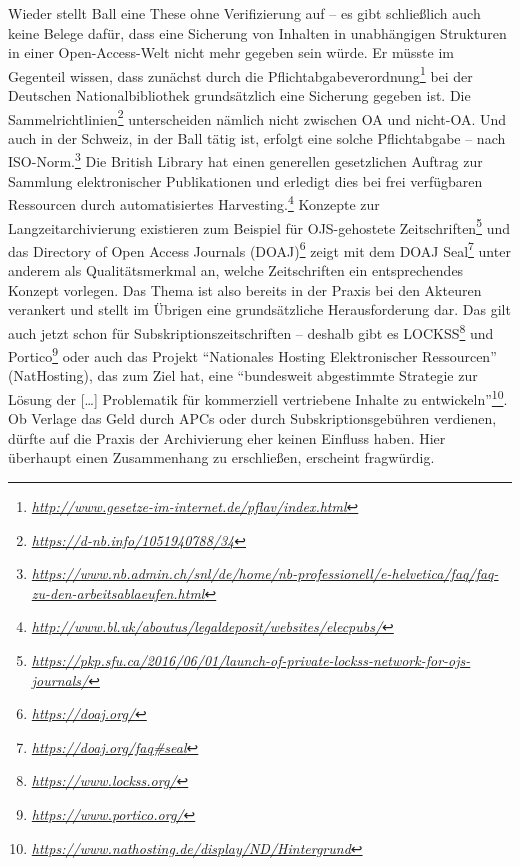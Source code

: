 \documentclass[a4paper,
fontsize=11pt,
oneside,
numbers=noperiodatend,
parskip=half-,
bibliography=totoc,
final
]{scrartcl}
\begin{document}
Wieder stellt Ball eine These ohne Verifizierung auf -- es gibt
schließlich auch keine Belege dafür, dass eine Sicherung von Inhalten in
unabhängigen Strukturen in einer Open-Access-Welt nicht mehr gegeben
sein würde. Er müsste im Gegenteil wissen, dass zunächst durch die
Pflichtabgabeverordnung\footnote{\href{http://www.gesetze-im-internet.de/pflav/index.html}{\emph{http://www.gesetze-im-internet.de/pflav/index.html}}}
bei der Deutschen Nationalbibliothek grundsätzlich eine Sicherung
gegeben ist. Die Sammelrichtlinien\footnote{\href{https://d-nb.info/1051940788/34}{\emph{https://d-nb.info/1051940788/34}}}
unterscheiden nämlich nicht zwischen OA und nicht-OA. Und auch in der
Schweiz, in der Ball tätig ist, erfolgt eine solche Pflichtabgabe --
nach ISO-Norm.\footnote{\href{https://www.nb.admin.ch/snl/de/home/nb-professionell/e-helvetica/faq/faq-zu-den-arbeitsablaeufen.html}{\emph{https://www.nb.admin.ch/snl/de/home/nb-professionell/e-helvetica/faq/faq-zu-den-arbeitsablaeufen.html}}}
Die British Library hat einen generellen gesetzlichen Auftrag zur
Sammlung elektronischer Publikationen und erledigt dies bei frei
verfügbaren Ressourcen durch automatisiertes Harvesting.\footnote{\href{http://www.bl.uk/aboutus/legaldeposit/websites/elecpubs/}{\emph{http://www.bl.uk/aboutus/legaldeposit/websites/elecpubs/}}}
Konzepte zur Langzeitarchivierung existieren zum Beispiel für
OJS-gehostete Zeitschriften\footnote{\href{https://pkp.sfu.ca/2016/06/01/launch-of-private-lockss-network-for-ojs-journals/}{\emph{https://pkp.sfu.ca/2016/06/01/launch-of-private-lockss-network-for-ojs-journals/}}}
und das Directory of Open Access Journals (DOAJ)\footnote{\href{https://doaj.org/}{\emph{https://doaj.org/}}}
zeigt mit dem DOAJ Seal\footnote{\href{https://doaj.org/faq\#seal}{\emph{https://doaj.org/faq\#seal}}}
unter anderem als Qualitätsmerkmal an, welche Zeitschriften ein
entsprechendes Konzept vorlegen. Das Thema ist also bereits in der
Praxis bei den Akteuren verankert und stellt im Übrigen eine
grundsätzliche Herausforderung dar. Das gilt auch jetzt schon für
Subskriptionszeitschriften -- deshalb gibt es LOCKSS\footnote{\href{https://www.lockss.org/}{\emph{https://www.lockss.org/}}}
und Portico\footnote{\href{https://www.portico.org/}{\emph{https://www.portico.org/}}}
oder auch das Projekt \enquote{Nationales Hosting Elektronischer
Ressourcen} (NatHosting), das zum Ziel hat, eine \enquote{bundesweit
abgestimmte Strategie zur Lösung der {[}\ldots{}{]} Problematik für
kommerziell vertriebene Inhalte zu entwickeln}\footnote{\href{https://www.nathosting.de/display/ND/Hintergrund}{\emph{https://www.nathosting.de/display/ND/Hintergrund}}}.
Ob Verlage das Geld durch APCs oder durch Subskriptionsgebühren
verdienen, dürfte auf die Praxis der Archivierung eher keinen Einfluss
haben. Hier überhaupt einen Zusammenhang zu erschließen, erscheint
fragwürdig.
\end{document}
